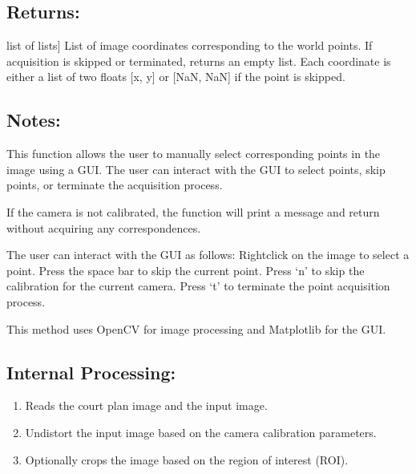 \documentclass[letterpaper,10pt,english]{sphinxmanual}
\begin{document}
\begin{fulllineitems}
\begin{fulllineitems}
\subsection{Returns:}
\label{\detokenize{CameraUtils:id11}}\begin{description}
\sphinxlineitem{coords}{[}list of lists{]}
\sphinxAtStartPar
List of image coordinates corresponding to the world points. If acquisition is skipped or terminated, returns an empty list.
Each coordinate is either a list of two floats {[}x, y{]} or {[}NaN, NaN{]} if the point is skipped.

\end{description}


\subsection{Notes:}
\label{\detokenize{CameraUtils:id12}}
\sphinxAtStartPar
This function allows the user to manually select corresponding points in the image using a GUI. The user can interact with the GUI to select points, skip points, or terminate the acquisition process.

\sphinxAtStartPar
If the camera is not calibrated, the function will print a message and return without acquiring any correspondences.

\sphinxAtStartPar
The user can interact with the GUI as follows:
\sphinxhyphen{} Right\sphinxhyphen{}click on the image to select a point.
\sphinxhyphen{} Press the space bar to skip the current point.
\sphinxhyphen{} Press ‘n’ to skip the calibration for the current camera.
\sphinxhyphen{} Press ‘t’ to terminate the point acquisition process.

\sphinxAtStartPar
This method uses OpenCV for image processing and Matplotlib for the GUI.


\subsection{Internal Processing:}
\label{\detokenize{CameraUtils:internal-processing}}\begin{enumerate}
%
\item {} 
\sphinxAtStartPar
Reads the court plan image and the input image.

\item {} 
\sphinxAtStartPar
Undistort the input image based on the camera calibration parameters.

\item {} 
\sphinxAtStartPar
Optionally crops the image based on the region of interest (ROI).


\end{enumerate}
\end{fulllineitems}
\end{fulllineitems}
\end{document}
